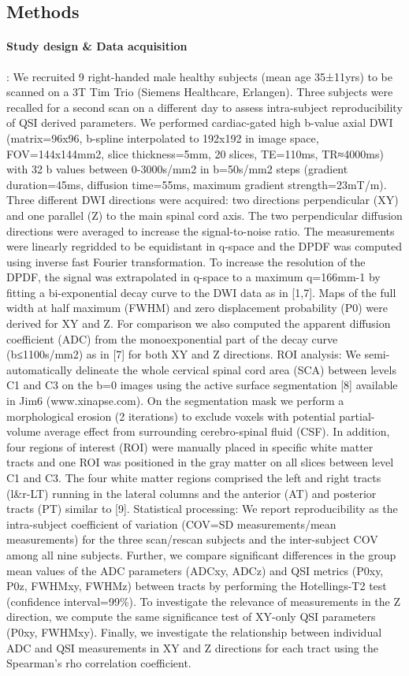\subsection*{Methods}
\paragraph{Study design \& Data acquisition}: We recruited 9 right-handed male healthy subjects (mean age 35±11yrs) to be scanned on a 3T Tim Trio (Siemens Healthcare, Erlangen). Three subjects were recalled for a second scan on a different day to assess intra-subject reproducibility of QSI derived parameters. We performed cardiac-gated high b-value axial DWI (matrix=96x96, b-spline interpolated to 192x192 in image space, FOV=144x144mm2, slice thickness=5mm, 20 slices, TE=110ms, TR≈4000ms) with 32 b values between 0-3000s/mm2 in b=50s/mm2 steps (gradient duration=45ms, diffusion time=55ms, maximum gradient strength=23mT/m). Three different DWI directions were acquired: two directions perpendicular (XY) and one parallel (Z) to the main spinal cord axis. The two perpendicular diffusion directions were averaged to increase the signal-to-noise ratio. The measurements were linearly regridded to be equidistant in q-space and the DPDF was computed using inverse fast Fourier transformation. To increase the resolution of the DPDF, the signal was extrapolated in q-space to a maximum q=166mm-1 by fitting a bi-exponential decay curve to the DWI data as in [1,7]. Maps of the full width at half maximum (FWHM) and zero displacement probability (P0) were derived for XY and Z. For comparison we also computed the apparent diffusion coefficient (ADC) from the monoexponential part of the decay curve (b≤1100s/mm2) as in [7] for both XY and Z directions.    
ROI analysis: We semi-automatically delineate the whole cervical spinal cord area (SCA) between levels C1 and C3 on the b=0 images using the active surface segmentation [8] available in Jim6 (www.xinapse.com). On the segmentation mask we perform a morphological erosion (2 iterations) to exclude voxels with potential partial-volume average effect from surrounding cerebro-spinal fluid (CSF). In addition, four regions of interest (ROI) were manually placed in specific white matter tracts and one ROI was positioned in the gray matter on all slices between level C1 and C3. The four white matter regions comprised the left and right tracts (l\&r-LT) running in the lateral columns and the anterior (AT) and posterior tracts (PT) similar to [9]. 
Statistical processing: We report reproducibility as the intra-subject coefficient of variation (COV=SD measurements/mean measurements) for the three scan/rescan subjects and the inter-subject COV among all nine subjects. Further, we compare significant differences in the group mean values of the ADC parameters (ADCxy, ADCz) and QSI metrics (P0xy, P0z, FWHMxy, FWHMz) between tracts by performing the Hotellings-T2 test (confidence interval=99\%). To investigate the relevance of measurements in the Z direction, we compute the same significance test of XY-only QSI parameters (P0xy, FWHMxy). Finally, we investigate the relationship between individual ADC and QSI measurements in XY and Z directions for each tract using the Spearman’s rho correlation coefficient. 
